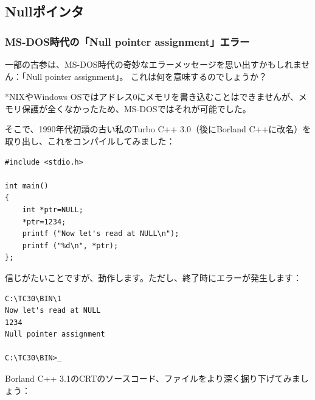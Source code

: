 \subsection{Nullポインタ}

\subsubsection{MS-DOS時代の「Null pointer assignment」エラー}

一部の古参は、MS-DOS時代の奇妙なエラーメッセージを思い出すかもしれません：「Null pointer assignment」。
これは何を意味するのでしょうか？

*NIXやWindows OSではアドレス0にメモリを書き込むことはできませんが、メモリ保護が全くなかったため、MS-DOSではそれが可能でした。

そこで、1990年代初頭の古い私のTurbo C++ 3.0（後にBorland C++に改名）を取り出し、これをコンパイルしてみました：

\begin{lstlisting}[style=customc]
#include <stdio.h>

int main()
{
	int *ptr=NULL;
	*ptr=1234;
	printf ("Now let's read at NULL\n");
	printf ("%d\n", *ptr);
};
\end{lstlisting}

信じがたいことですが、動作します。ただし、終了時にエラーが発生します：

\begin{lstlisting}[caption=古いTurbo C 3.0]
C:\TC30\BIN\1
Now let's read at NULL
1234
Null pointer assignment

C:\TC30\BIN>_
\end{lstlisting}

Borland C++ 3.1の\ac{CRT}のソースコード、ファイルをより深く掘り下げてみましょう：

